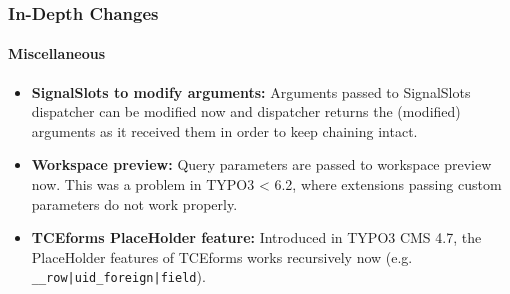 \begin{frame}[fragile]
	\frametitle{In-Depth Changes}
	\framesubtitle{Miscellaneous}

	\begin{itemize}

		\item \textbf{SignalSlots to modify arguments:}\newline
			\small
				Arguments passed to SignalSlots dispatcher can be modified now and dispatcher returns the (modified) arguments as it received them in order to keep chaining intact.
			\normalsize

		\item \textbf{Workspace preview:}\newline
			\small
				Query parameters are passed to workspace preview now. This was a problem in TYPO3 < 6.2, where extensions passing custom parameters do not work properly.
			\normalsize

		\item \textbf{TCEforms PlaceHolder feature:}\newline
			\small
				Introduced in TYPO3 CMS 4.7, the PlaceHolder features of TCEforms works recursively now (e.g. \texttt{\_\_row|uid\_foreign|field}).
			\normalsize

	\end{itemize}
	
\end{frame}


